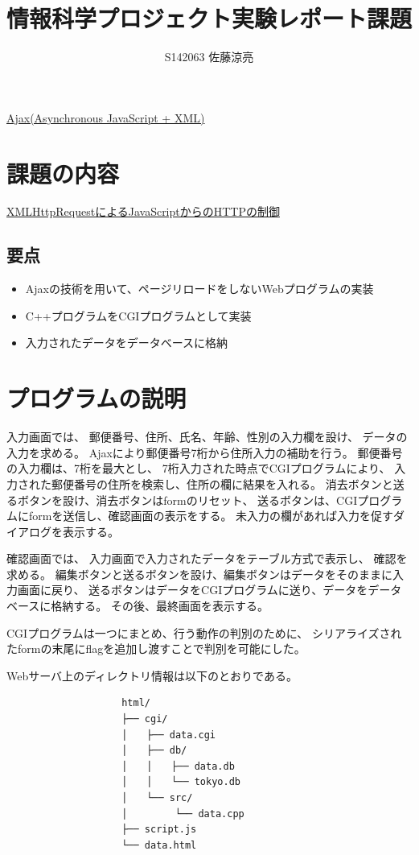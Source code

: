 \documentclass[a4j]{jarticle}
\title{情報科学プロジェクト実験レポート課題}
\author{S142063 佐藤涼亮}
\begin{document}
\maketitle
\centerline{\LARGE \underline{Ajax(Asynchronous JavaScript + XML)}}
\section{課題の内容}
{\large \underline{XMLHttpRequestによるJavaScriptからのHTTPの制御}}
\subsection{要点}
\begin{itemize}
\item Ajaxの技術を用いて、ページリロードをしないWebプログラムの実装
\item C++プログラムをCGIプログラムとして実装
\item 入力されたデータをデータベースに格納
\end{itemize}
\section{プログラムの説明}
入力画面では、
郵便番号、住所、氏名、年齢、性別の入力欄を設け、
データの入力を求める。
Ajaxにより郵便番号7桁から住所入力の補助を行う。
郵便番号の入力欄は、7桁を最大とし、
7桁入力された時点でCGIプログラムにより、
入力された郵便番号の住所を検索し、住所の欄に結果を入れる。
消去ボタンと送るボタンを設け、消去ボタンはformのリセット、
送るボタンは、CGIプログラムにformを送信し、確認画面の表示をする。
未入力の欄があれば入力を促すダイアログを表示する。

確認画面では、
入力画面で入力されたデータをテーブル方式で表示し、
確認を求める。
編集ボタンと送るボタンを設け、編集ボタンはデータをそのままに入力画面に戻り、
送るボタンはデータをCGIプログラムに送り、データをデータベースに格納する。
その後、最終画面を表示する。

CGIプログラムは一つにまとめ、行う動作の判別のために、
シリアライズされたformの末尾にflagを追加し渡すことで判別を可能にした。

\newpage
Webサーバ上のディレクトリ情報は以下のとおりである。
\begin{verbatim}
                    html/
                    ├── cgi/
                    │　　├── data.cgi
                    │　　├── db/
                    │　　│　　├── data.db
                    │　　│　　└── tokyo.db
                    │　　└── src/
                    │　　　　　└── data.cpp
                    ├── script.js
                    └── data.html
\end{verbatim}
\end{document}
